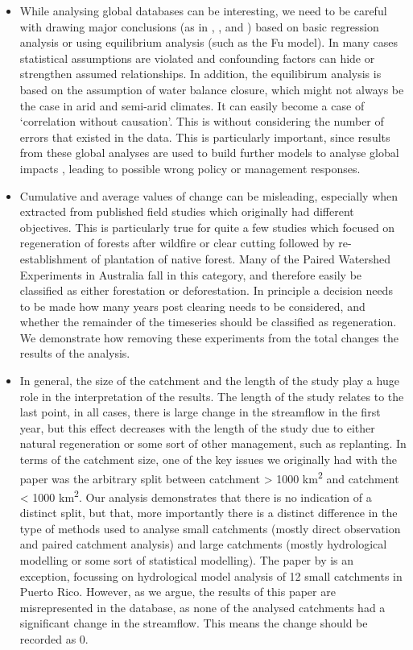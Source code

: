\documentclass[]{elsarticle} %
\providecommand{\tightlist}{%
  \setlength{\itemsep}{0pt}\setlength{\parskip}{0pt}}
\begin{document}
\begin{itemize}
\tightlist
\item
  While analysing global databases can be interesting, we need to be careful with drawing major conclusions (as in \citet{zhang2017}, \citet{filoso2017}, \citet{zhou2015} and \citet{jackson2005}) based on basic regression analysis or using equilibrium analysis (such as the Fu model). In many cases statistical assumptions are violated and confounding factors can hide or strengthen assumed relationships. In addition, the equilibirum analysis is based on the assumption of water balance closure, which might not always be the case in arid and semi-arid climates. It can easily become a case of `correlation without causation'. This is without considering the number of errors that existed in the data. This is particularly important, since results from these global analyses are used to build further models to analyse global impacts \citep[e.g.][]{hoekvandijke2022}, leading to possible wrong policy or management responses.\\
\item
  Cumulative and average values of change can be misleading, especially when extracted from published field studies which originally had different objectives. This is particularly true for quite a few studies which focused on regeneration of forests after wildfire or clear cutting followed by re-establishment of plantation of native forest. Many of the Paired Watershed Experiments in Australia \citep[e.g.][]{cornish2001, webb2009, webb2012, webb2013, watson2001} fall in this category, and therefore easily be classified as either forestation or deforestation. In principle a decision needs to be made how many years post clearing needs to be considered, and whether the remainder of the timeseries should be classified as regeneration. We demonstrate how removing these experiments from the total changes the results of the analysis.
\item
  In general, the size of the catchment and the length of the study play a huge role in the interpretation of the results. The length of the study relates to the last point, in all cases, there is large change in the streamflow in the first year, but this effect decreases with the length of the study due to either natural regeneration or some sort of other management, such as replanting. In terms of the catchment size, one of the key issues we originally had with the \citet{zhang2017} paper was the arbitrary split between catchment \textgreater{} 1000 km\textsuperscript{2} and catchment \textless{} 1000 km\textsuperscript{2}. Our analysis demonstrates that there is no indication of a distinct split, but that, more importantly there is a distinct difference in the type of methods used to analyse small catchments (mostly direct observation and paired catchment analysis) and large catchments (mostly hydrological modelling or some sort of statistical modelling). The paper by \citet{beck2013} is an exception, focussing on hydrological model analysis of 12 small catchments in Puerto Rico. However, as we argue, the results of this paper are misrepresented in the database, as none of the analysed catchments had a significant change in the streamflow. This means the change should be recorded as 0.\\

\end{itemize}
\end{document}
